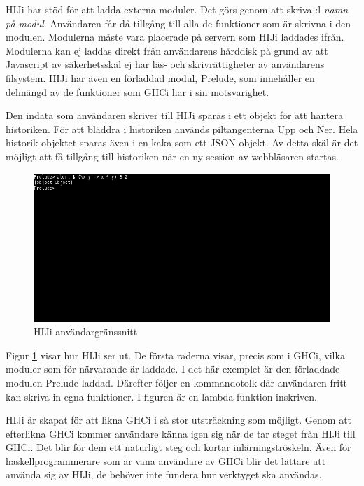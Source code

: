 HIJi har stöd för att ladda externa moduler. Det görs genom att skriva :l \emph{namn-på-modul}. Användaren får då tillgång till alla de funktioner som är skrivna i den modulen. Modulerna måste vara placerade på servern som HIJi laddades ifrån. Modulerna kan ej laddas direkt från användarens hårddisk på grund av att Javascript av säkerhetsskäl ej har läs- och skrivrättigheter av användarens filsystem. HIJi har även en förladdad modul, Prelude, som innehåller en delmängd av de funktioner som GHCi har i sin motsvarighet. 

Den indata som användaren skriver till HIJi sparas i ett objekt för att hantera historiken. För att bläddra i historiken används piltangenterna Upp och Ner. Hela historik-objektet sparas även i en kaka som ett JSON-objekt. Av detta skäl är det möjligt att få tillgång till historiken när en ny session av webbläsaren startas.

% 
\begin{figure}[H]
    \begin{center}
        \includegraphics[width=1\textwidth]{hiji_screen3.png}
        \caption{HIJi användargränssnitt}
        \label{fig:hiji} %
    \end{center}
\end{figure}

Figur \ref{fig:hiji} visar hur HIJi ser ut. De första raderna visar, precis som i GHCi, vilka moduler som för närvarande är laddade. I det här exemplet är den förladdade modulen Prelude laddad. Därefter följer en kommandotolk där användaren fritt kan skriva in egna funktioner. I figuren är en lambda-funktion inskriven.

HIJi är skapat för att likna GHCi i så stor utsträckning som möjligt.
Genom att efterlikna GHCi kommer användare känna igen sig när de tar steget från HIJi till GHCi. Det blir för dem ett naturligt steg och kortar inlärningströskeln. Även för haskellprogrammerare som är vana användare av GHCi blir det lättare att använda sig av HIJi, de behöver inte fundera hur verktyget ska användas.

